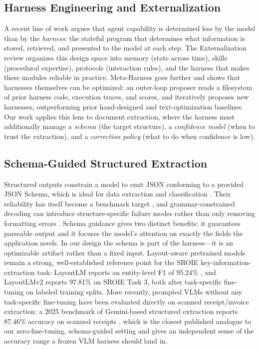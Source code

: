 \documentclass[conference]{IEEEtran}
\begin{document}
\subsection{Harness Engineering and Externalization}
A recent line of work argues that agent capability is determined less by the model than by the \emph{harness}: the stateful program that determines what information is stored, retrieved, and presented to the model at each step. The Externalization review \cite{b1} organizes this design space into memory (state across time), skills (procedural expertise), protocols (interaction rules), and the harness that makes these modules reliable in practice. Meta-Harness \cite{b2} goes further and shows that harnesses themselves can be optimized: an outer-loop proposer reads a filesystem of prior harness code, execution traces, and scores, and iteratively proposes new harnesses, outperforming prior hand-designed and text-optimization baselines. Our work applies this lens to document extraction, where the harness must additionally manage a \emph{schema} (the target structure), a \emph{confidence model} (when to trust the extraction), and a \emph{correction policy} (what to do when confidence is low).

\subsection{Schema-Guided Structured Extraction}
Structured outputs constrain a model to emit JSON conforming to a provided JSON Schema, which is ideal for data extraction and classification \cite{b4}. Their reliability has itself become a benchmark target \cite{b30}, and grammar-constrained decoding can introduce structure-specific failure modes rather than only removing formatting errors \cite{b31}. Schema guidance gives two distinct benefits: it guarantees parseable output and it focuses the model's attention on exactly the fields the application needs. In our design the schema is part of the harness---it is an optimizable artifact rather than a fixed input. Layout-aware pretrained models remain a strong, well-established reference point for the SROIE key-information-extraction task: LayoutLM reports an entity-level F1 of 95.24\% \cite{b8}, and LayoutLMv2 reports 97.81\% \cite{b9} on SROIE Task 3, both after task-specific fine-tuning on labeled training splits. More recently, prompted VLMs without any task-specific fine-tuning have been evaluated directly on scanned receipt/invoice extraction: a 2025 benchmark of Gemini-based structured extraction reports 87.46\% accuracy on scanned receipts \cite{b10}, which is the closest published analogue to our zero-fine-tuning, schema-guided setting and gives an independent sense of the accuracy range a frozen VLM harness should land in.
\end{document}
